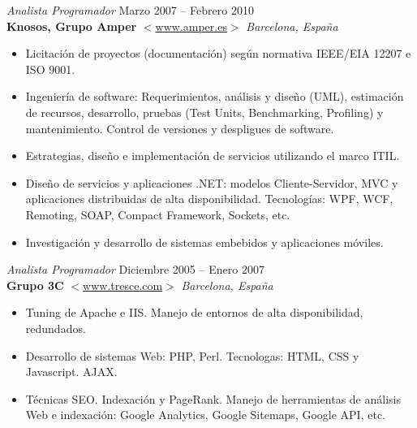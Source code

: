 \documentclass[line,margin]{res}
\begin{document}
\begin{resume}
                {\sl Analista Programador} \hfill            Marzo 2007 -- Febrero 2010 \\
                \textbf{Knosos, Grupo Amper} 
                $<$\url{www.amper.es}$>$ \hfill \textit{Barcelona, Espa\~{n}a}
                \begin{itemize}  \itemsep 2pt %
                \item Licitaci\'{o}n de proyectos (documentaci\'{o}n) 
                seg\'{u}n normativa IEEE/EIA 12207 e ISO 9001.
                \item Ingenier\'{i}a de software: Requerimientos, an\'{a}lisis y 
                dise\~{n}o (UML), estimaci\'{o}n de recursos, desarrollo, 
                pruebas (Test Units, Benchmarking, Profiling) y mantenimiento. 
                Control de versiones y despligues de software.
                \item Estrategias, dise\~{n}o e implementaci\'{o}n de servicios 
                utilizando el marco ITIL.
                \item Dise\~{n}o de servicios y aplicaciones .NET: modelos 
                Cliente-Servidor, MVC y aplicaciones distribuidas de alta 
                disponibilidad. Tecnolog\'{i}as: WPF, WCF, Remoting, SOAP, 
                Compact Framework, Sockets, etc.
                \item Investigaci\'{o}n y desarrollo de sistemas embebidos y 
                aplicaciones m\'{o}viles.
                \\
                \end{itemize}


                {\sl Analista Programador} \hfill Diciembre 2005 -- Enero 2007 \\
                \textbf{Grupo 3C} 
                $<$\url{www.tresce.com}$>$ \hfill \textit{Barcelona, 
                Espa\~{n}a}
                \begin{itemize}  \itemsep 2pt %
                \item Tuning de Apache e IIS. Manejo de entornos de 
                alta disponibilidad, redundados.
                \item Desarrollo de sistemas Web: PHP, Perl. Tecnologas: HTML, 
                CSS y Javascript. AJAX.
                \item T\'{e}cnicas SEO. Indexaci\'{o}n y PageRank. Manejo de 
                herramientas de an\'{a}lisis Web e indexaci\'{o}n: 
                Google Analytics, Google Sitemaps, Google API, etc.
                \\
                \end{itemize} 


\end{resume}
\end{document}
